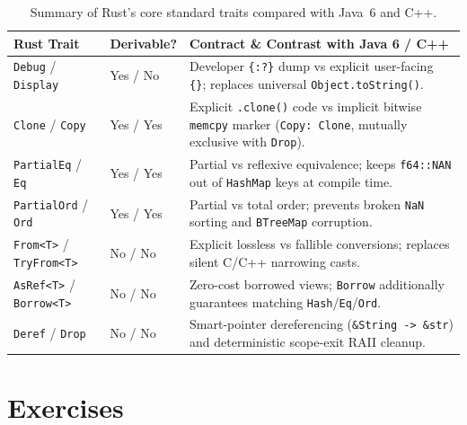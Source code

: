 \begin{table}[H]
\centering
\caption{Summary of Rust's core standard traits compared with Java~6 and C++.}
\label{ch06:tab-std-traits}
\footnotesize
\begin{tabular}{@{}llp{7.8cm}@{}}
\toprule
\textbf{Rust Trait} & \textbf{Derivable?} & \textbf{Contract \& Contrast with Java 6 / C++} \\
\midrule
\texttt{Debug} / \texttt{Display} & Yes / No & Developer \texttt{\{:?\}} dump vs explicit user-facing \texttt{\{\}}; replaces universal \texttt{Object.toString()}. \\
\texttt{Clone} / \texttt{Copy} & Yes / Yes & Explicit \texttt{.clone()} code vs implicit bitwise \texttt{memcpy} marker (\texttt{Copy: Clone}, mutually exclusive with \texttt{Drop}). \\
\texttt{PartialEq} / \texttt{Eq} & Yes / Yes & Partial vs reflexive equivalence; keeps \texttt{f64::NAN} out of \texttt{HashMap} keys at compile time. \\
\texttt{PartialOrd} / \texttt{Ord} & Yes / Yes & Partial vs total order; prevents broken \texttt{NaN} sorting and \texttt{BTreeMap} corruption. \\
\texttt{From<T>} / \texttt{TryFrom<T>} & No / No & Explicit lossless vs fallible conversions; replaces silent C/C++ narrowing casts. \\
\texttt{AsRef<T>} / \texttt{Borrow<T>} & No / No & Zero-cost borrowed views; \texttt{Borrow} additionally guarantees matching \texttt{Hash}/\texttt{Eq}/\texttt{Ord}. \\
\texttt{Deref} / \texttt{Drop} & No / No & Smart-pointer dereferencing (\texttt{\&String -> \&str}) and deterministic scope-exit RAII cleanup. \\
\bottomrule
\end{tabular}
\end{table}

\section{Exercises}
\label{ch06:exercises}

